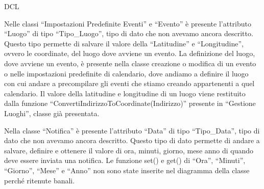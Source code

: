\begin{listaPersonale}{DCL}

    Nelle classi “Impostazioni Predefinite Eventi” e “Evento” è presente l'attributo “Luogo” di tipo “Tipo\_Luogo”, tipo di dato che non avevamo ancora descritto. Questo tipo permette di salvare il valore della “Latitudine” e “Longitudine”, ovvero le coordinate, del luogo dove avviene un evento. La definizione del luogo, dove avviene un evento, è presente nella classe creazione o modifica di un evento o nelle impostazioni predefinite di calendario, dove andiamo a definire il luogo con cui andare a precompilare gli eventi che stiamo creando appartenenti a quel calendario. Il valore della latitudine e longitudine di un luogo viene restituito dalla funzione “ConvertiIndirizzoToCoordinate(Indirizzo)” presente in “Gestione Luoghi”, classe già presentata.
    \begin{comment}
        \begin{center}
            \\
            \blfootnote{Immagine \href{https://github.com/Life-planner/Documentazione/blob/main/D3/img/Diagrammi/png/path/to/img.png}{PNG}/\href{https://github.com/Life-planner/Documentazione/blob/main/D3/img/Diagrammi/svg/path/to/img.svg}{SVG} nome file}
        \end{center}
    \end{comment}



    Nella classe “Notifica” è presente l'attributo “Data” di tipo “Tipo\_Data”, tipo di dato che non avevamo ancora descritto. Questo tipo di dato permette di andare a salvare, definire e ottenere il valore di ora, minuti, giorno, mese anno di quando deve essere inviata una notifica. Le funzione set() e get() di “Ora”, “Minuti”, “Giorno”, “Mese” e “Anno” non sono state inserite nel diagramma della classe perché ritenute banali.
    \begin{comment}
        \begin{center}
            \\
            \blfootnote{Immagine \href{https://github.com/Life-planner/Documentazione/blob/main/D3/img/Diagrammi/png/path/to/img.png}{PNG}/\href{https://github.com/Life-planner/Documentazione/blob/main/D3/img/Diagrammi/svg/path/to/img.svg}{SVG} nome file}
        \end{center}
    \end{comment}



\end{listaPersonale}
